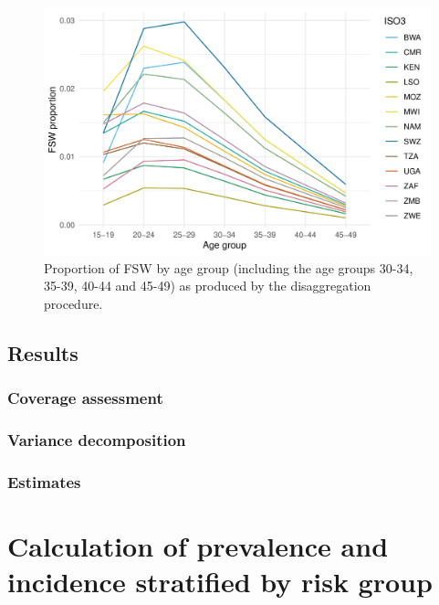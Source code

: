 \documentclass[a4paper, nobind]{templates/ociamthesis}
\begin{document}
\begin{figure}
\includegraphics[width=0.9\linewidth]{figures/multi-agyw/age-disagg-fsw-line} \caption{Proportion of FSW by age group (including the age groups 30-34, 35-39, 40-44 and 45-49) as produced by the disaggregation procedure.}\label{fig:age-disagg-fsw-line}
\end{figure}

\hypertarget{results-2}{%
\subsection{Results}\label{results-2}}

\hypertarget{coverage-assessment-1}{%
\subsubsection{Coverage assessment}\label{coverage-assessment-1}}

\hypertarget{variance-decomposition}{%
\subsubsection{Variance decomposition}\label{variance-decomposition}}

\hypertarget{estimates}{%
\subsubsection{Estimates}\label{estimates}}

\hypertarget{calculation-of-prevalence-and-incidence-stratified-by-risk-group}{%
\section{Calculation of prevalence and incidence stratified by risk group}\label{calculation-of-prevalence-and-incidence-stratified-by-risk-group}}
\end{document}

